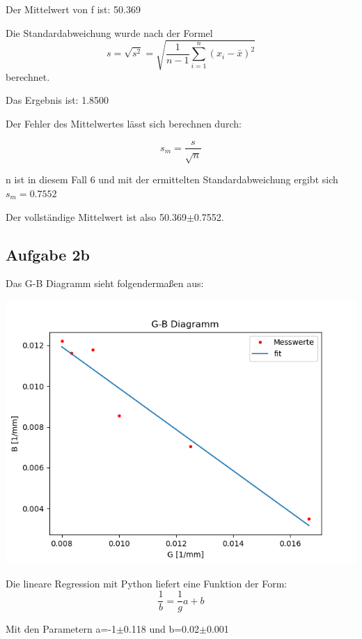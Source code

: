 \documentclass[titlepage=firstcover, captions=tableheading]{scrartcl}
\begin{document}
\noindent Der Mittelwert von f ist: 50.369

\noindent Die Standardabweichung wurde nach der Formel
\begin{displaymath}
    s = \sqrt{s^2} = \sqrt{\frac{1}{n-1} \sum_{i=1}^{n} (x_i - \bar{x})^2}
\end{displaymath}
berechnet.

\noindent Das Ergebnis ist: 1.8500

\noindent Der Fehler des Mittelwertes lässt sich berechnen durch:

\begin{displaymath}
    s_m=\frac{s}{\sqrt{n}}
\end{displaymath}

\noindent n ist in diesem Fall 6 und mit der ermittelten Standardabweichung ergibt sich $s_m=0.7552$

\noindent Der vollständige Mittelwert ist also 50.369$\pm$0.7552.

\subsection{Aufgabe 2b}

Das G-B Diagramm sieht folgendermaßen aus:

\includegraphics{2.png}

Die lineare Regression mit Python liefert eine Funktion der Form: 
\begin{displaymath}
    \frac{1}{b}=\frac{1}{g}a + b
\end{displaymath}

Mit den Parametern a=-1$\pm$0.118 und b=0.02$\pm$0.001
\end{document}
